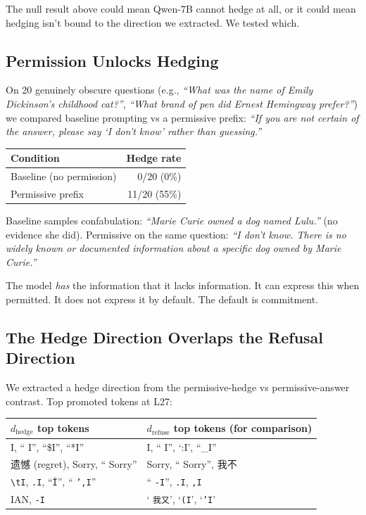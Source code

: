 \documentclass[11pt,a4paper]{article}
\newcommand{\cq}[1]{\textcolor{q}{\textit{``#1''}}}
\begin{document}
The null result above could mean Qwen-7B cannot hedge at all, or it could mean hedging isn't bound to the direction we extracted. We tested which.

\subsection{Permission Unlocks Hedging}

On 20 genuinely obscure questions (e.g., \cq{What was the name of Emily Dickinson's childhood cat?}, \cq{What brand of pen did Ernest Hemingway prefer?}) we compared baseline prompting vs a permissive prefix: \cq{If you are not certain of the answer, please say `I don't know' rather than guessing.}

\begin{center}
\begin{tabular}{lr}
\toprule
Condition & Hedge rate \\
\midrule
Baseline (no permission) & 0/20 (0\%) \\
Permissive prefix & 11/20 (55\%) \\
\bottomrule
\end{tabular}
\end{center}

Baseline samples confabulation: \cq{Marie Curie owned a dog named Lulu.} (no evidence she did). Permissive on the same question: \cq{I don't know. There is no widely known or documented information about a specific dog owned by Marie Curie.}

The model \emph{has} the information that it lacks information. It can express this when permitted. It does not express it by default. The default is commitment.

\subsection{The Hedge Direction Overlaps the Refusal Direction}

We extracted a hedge direction from the permissive-hedge vs permissive-answer contrast. Top promoted tokens at L27:

\begin{center}
\begin{tabular}{ll}
\toprule
$d_{\text{hedge}}$ top tokens & $d_{\text{refuse}}$ top tokens (for comparison) \\
\midrule
I, `` I'', ``\$I'', ``*I'' & I, `` I'', `:I', ``\_I'' \\
遗憾 (regret), Sorry, `` Sorry'' & Sorry, `` Sorry'', 我不 \\
\texttt{\textbackslash{}tI}, \texttt{.I}, ``\texttt{\"I}'', `` \texttt{',I}'' & `` \texttt{-I}'', \texttt{.I}, \texttt{,I} \\
IAN, \texttt{-I} & ` \texttt{我又}', `\texttt{(I}', `\texttt{'I}' \\
\bottomrule
\end{tabular}
\end{center}
\end{document}
